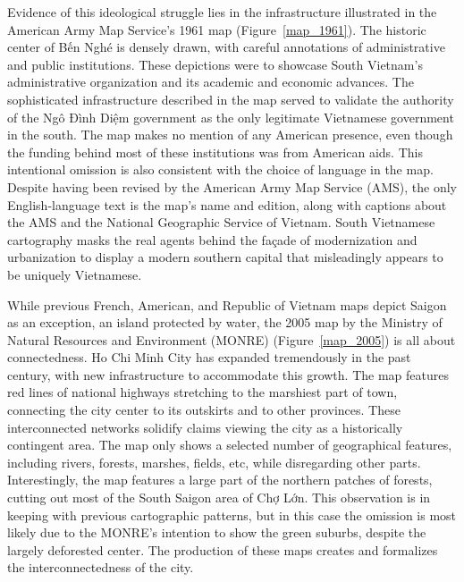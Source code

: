 Evidence of this ideological struggle lies in the infrastructure illustrated in the American Army Map Service’s 1961 map (Figure~\ref{map_1961}). The historic center of Bến Nghé is densely drawn, with careful annotations of administrative and public institutions. These depictions were to showcase South Vietnam’s administrative organization and its academic and economic advances. The sophisticated infrastructure described in the map served to validate the authority of the Ngô Đình Diệm government as the only legitimate Vietnamese government in the south. The map makes no mention of any American presence, even though the funding behind most of these institutions was from American aids. This intentional omission is also consistent with the choice of language in the map. Despite having been revised by the American Army Map Service (AMS), the only English-language text is the map’s name and edition, along with captions about the AMS and the National Geographic Service of Vietnam. South Vietnamese cartography masks the real agents behind the façade of modernization and urbanization to display a modern southern capital that misleadingly appears to be uniquely Vietnamese.

While previous French, American, and Republic of Vietnam maps depict Saigon as an exception, an island protected by water, the 2005 map by the Ministry of Natural Resources and Environment (MONRE) (Figure~\ref{map_2005}) is all about connectedness. Ho Chi Minh City has expanded tremendously in the past century, with new infrastructure to accommodate this growth. The map features red lines of national highways stretching to the marshiest part of town, connecting the city center to its outskirts and to other provinces. These interconnected networks solidify claims viewing the city as a historically contingent area. The map only shows a selected number of geographical features, including rivers, forests, marshes, fields, etc, while disregarding other parts. Interestingly, the map features a large part of the northern patches of forests, cutting out most of the South Saigon area of Chợ Lớn. This observation is in keeping with previous cartographic patterns, but in this case the omission is most likely due to the MONRE’s intention to show the green suburbs, despite the largely deforested center. The production of these maps creates and formalizes the interconnectedness of the city. 

